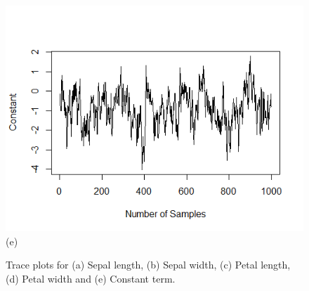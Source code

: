 \documentclass[11pt]{article}
\begin{document}
\begin{figure}[b]
\begin{center}
\[\begin{array}{cc}
   \end{array} \]
\vspace{-10pt}
    \includegraphics[width=0.5\linewidth]{tr_const.png} \\
(e)
  \end{center}
\vspace{-10pt}
\caption{Trace plots for (a) Sepal length, (b) Sepal width, (c) Petal length, (d) Petal width and (e) Constant term.}
\label{fig5}
\end{figure}  
\end{document}
